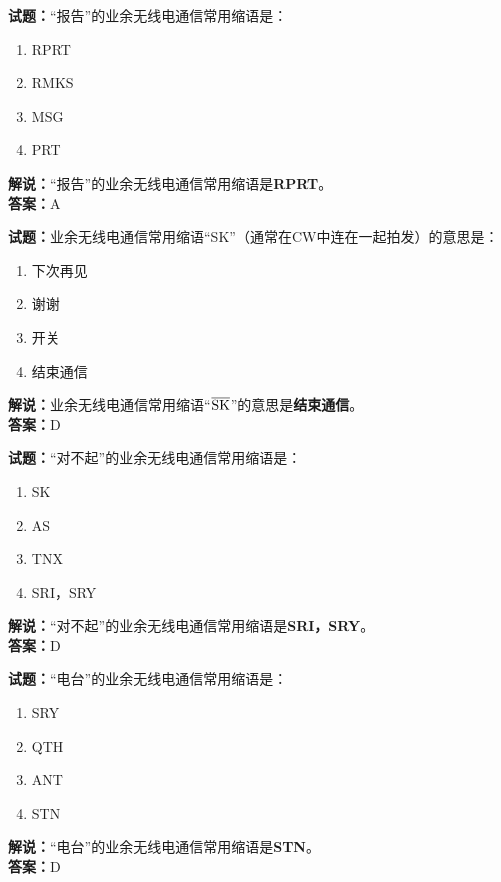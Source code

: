 \documentclass{ctexbook}
\begin{document}
\bigskip


\noindent\textbf{试题：}“报告”的业余无线电通信常用缩语是：
\begin{enumerate}[leftmargin=3em]
\item RPRT
\item RMKS
\item MSG
\item PRT
\end{enumerate}
\noindent\textbf{解说：}“报告”的业余无线电通信常用缩语是\textbf{RPRT}。\\\noindent\textbf{答案：}A





\bigskip


\noindent\textbf{试题：}业余无线电通信常用缩语“SK”（通常在CW中连在一起拍发）的意思是：
\begin{enumerate}[leftmargin=3em]
\item 下次再见
\item 谢谢
\item 开关
\item 结束通信
\end{enumerate}
\noindent\textbf{解说：}业余无线电通信常用缩语“$\overline{\rm SK}$”的意思是\textbf{结束通信}。\\\noindent\textbf{答案：}D




\bigskip


\noindent\textbf{试题：}“对不起”的业余无线电通信常用缩语是：
\begin{enumerate}[leftmargin=3em]
\item SK
\item AS
\item TNX
\item SRI，SRY
\end{enumerate}
\noindent\textbf{解说：}“对不起”的业余无线电通信常用缩语是\textbf{SRI，SRY}。\\\noindent\textbf{答案：}D



\bigskip


\noindent\textbf{试题：}“电台”的业余无线电通信常用缩语是：
\begin{enumerate}[leftmargin=3em]
\item SRY
\item QTH
\item ANT
\item STN
\end{enumerate}
\noindent\textbf{解说：}“电台”的业余无线电通信常用缩语是\textbf{STN}。\\\noindent\textbf{答案：}D
\end{document}
